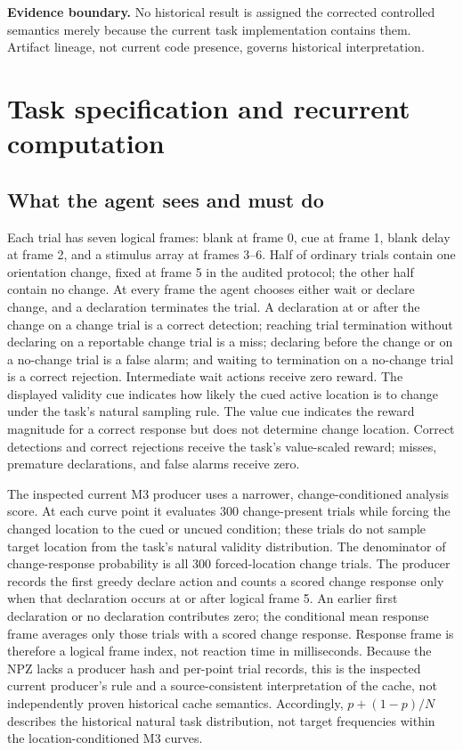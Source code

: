 \documentclass[11pt,a4paper]{article}
\newcommand{\boundary}[1]{\par\smallskip\noindent\colorbox{VdaLight}{\parbox{0.96\linewidth}{\textbf{Evidence boundary.} #1}}\par\smallskip}
\begin{document}
\boundary{No historical result is assigned the corrected controlled semantics merely because the current task implementation contains them. Artifact lineage, not current code presence, governs historical interpretation.}

\section{Task specification and recurrent computation}
\subsection{What the agent sees and must do}
Each trial has seven logical frames: blank at frame 0, cue at frame 1, blank delay at frame 2, and a stimulus array at frames 3--6. Half of ordinary trials contain one orientation change, fixed at frame 5 in the audited protocol; the other half contain no change. At every frame the agent chooses either wait or declare change, and a declaration terminates the trial. A declaration at or after the change on a change trial is a correct detection; reaching trial termination without declaring on a reportable change trial is a miss; declaring before the change or on a no-change trial is a false alarm; and waiting to termination on a no-change trial is a correct rejection. Intermediate wait actions receive zero reward. The displayed validity cue indicates how likely the cued active location is to change under the task's natural sampling rule. The value cue indicates the reward magnitude for a correct response but does not determine change location. Correct detections and correct rejections receive the task's value-scaled reward; misses, premature declarations, and false alarms receive zero.

The inspected current M3 producer uses a narrower, change-conditioned analysis score. At each curve point it evaluates 300 change-present trials while forcing the changed location to the cued or uncued condition; these trials do not sample target location from the task's natural validity distribution. The denominator of change-response probability is all 300 forced-location change trials. The producer records the first greedy declare action and counts a scored change response only when that declaration occurs at or after logical frame 5. An earlier first declaration or no declaration contributes zero; the conditional mean response frame averages only those trials with a scored change response. Response frame is therefore a logical frame index, not reaction time in milliseconds. Because the NPZ lacks a producer hash and per-point trial records, this is the inspected current producer's rule and a source-consistent interpretation of the cache, not independently proven historical cache semantics. Accordingly, $p+(1-p)/N$ describes the historical natural task distribution, not target frequencies within the location-conditioned M3 curves.
\end{document}

